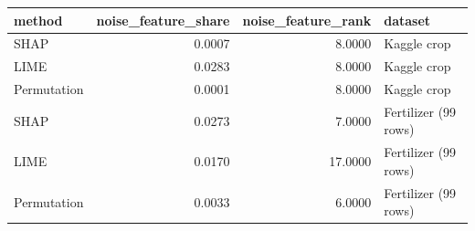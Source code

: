 \begin{tabular}{lrrl}
\toprule
method & noise_feature_share & noise_feature_rank & dataset \\
\midrule
SHAP & 0.0007 & 8.0000 & Kaggle crop \\
LIME & 0.0283 & 8.0000 & Kaggle crop \\
Permutation & 0.0001 & 8.0000 & Kaggle crop \\
SHAP & 0.0273 & 7.0000 & Fertilizer (99 rows) \\
LIME & 0.0170 & 17.0000 & Fertilizer (99 rows) \\
Permutation & 0.0033 & 6.0000 & Fertilizer (99 rows) \\
\bottomrule
\end{tabular}

